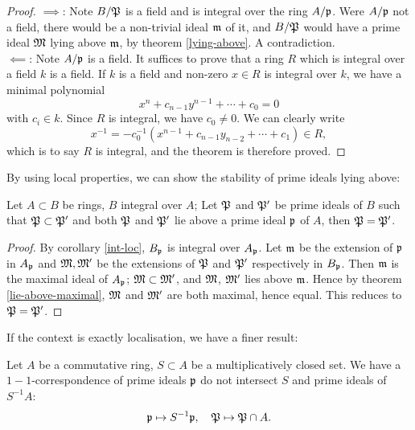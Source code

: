			\begin{proof}
				$\implies$: Note $B/\mathfrak{P}$ is a field and is integral over the ring $A/\mathfrak{p}$. Were $A/\mathfrak{p}$ not a field, there would be a non-trivial ideal $\mathfrak{m}$ of it, and $B/\mathfrak{P}$ would have a prime ideal $\mathfrak{M}$ lying above $\mathfrak{m}$, by theorem \ref{lying-above}. A contradiction. \\
				$\impliedby$: Note $A/\mathfrak{p}$ is a field. It suffices to prove that a ring $R$ which is integral over a field $k$ is a field. If $k$ is a field and non-zero $x \in R$ is integral over $k$, we have a minimal polynomial
				\[
				x^n+c_{n-1}y^{n-1}+\cdots+c_0=0
				\]
				with $c_i \in k$. Since $R$ is integral, we have $c_0 \ne 0$. We can clearly write
				\[
				x^{-1}=-c_0^{-1}(x^{n-1}+c_{n-1}y_{n-2}+\cdots+c_1) \in R,
				\]
				which is to say $R$ is integral, and the theorem is therefore proved.
			\end{proof}
			By using local properties, we can show the stability of prime ideals lying above:
			\begin{corollary}
				Let $A \subset B$ be rings, $B$ integral over $A$; Let $\mathfrak{P}$ and $\mathfrak{P}'$ be prime ideals of $B$ such that $\mathfrak{P} \subset \mathfrak{P}'$ and both $\mathfrak{P}$ and $\mathfrak{P}'$ lie above a prime ideal $\mathfrak{p}$ of $A$, then $\mathfrak{P}=\mathfrak{P}'$. 
			\end{corollary}
			\begin{proof}
				By corollary \ref{int-loc}, $B_\mathfrak{p}$ is integral over $A_\mathfrak{p}$. Let $\mathfrak{m}$ be the extension of $\mathfrak{p}$ in $A_\mathfrak{p}$ and $\mathfrak{M},\mathfrak{M}'$ be the extensions of $\mathfrak{P}$ and $\mathfrak{P}'$ respectively in $B_\mathfrak{p}$. Then $\mathfrak{m}$ is the maximal ideal of $A_\mathfrak{p}$; $\mathfrak{M} \subset \mathfrak{M}'$, and $\mathfrak{M}$, $\mathfrak{M}'$ lies above $\mathfrak{m}$. Hence by theorem \ref{lie-above-maximal}, $\mathfrak{M}$ and $\mathfrak{M}'$ are both maximal, hence equal. This reduces to $\mathfrak{P}=\mathfrak{P}'$.
			\end{proof}
			If the context is exactly localisation, we have a finer result:
			\begin{theorem}\label{loc-corr}
				Let $A$ be a commutative ring, $S \subset A$ be a multiplicatively closed set. We have a $1-1$-correspondence of prime ideals $\mathfrak{p}$ do not intersect $S$ and prime ideals of $S^{-1}A$:
				\[
					\mathfrak{p} \mapsto S^{-1}\mathfrak{p}, \quad \mathfrak{P} \mapsto \mathfrak{P} \cap A.
				\]
			\end{theorem}
